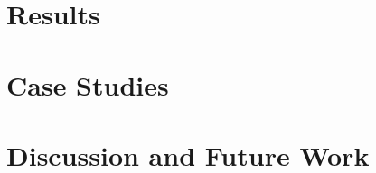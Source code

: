 \documentclass[review,sigconf]{acmart}
\begin{document}
\clearpage







\section{Results}
\label{res}


\section{Case Studies}
\label{sec:case}


    
\section{Discussion and Future Work}
\label{sec:discussion}





\end{document}

